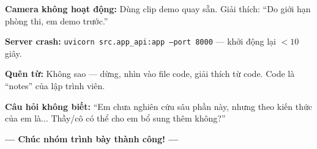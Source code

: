 \documentclass[12pt, a4paper]{article}
\begin{document}
\begin{tcolorbox}[colback=red!5, colframe=red!60, title=\textbf{Tình huống khẩn cấp}]
\textbf{Camera không hoạt động:}
Dùng clip demo quay sẵn. Giải thích: ``Do giới hạn phòng thi, em demo trước.''

\textbf{Server crash:}
\texttt{uvicorn src.app\_api:app --port 8000} --- khởi động lại $< 10$ giây.

\textbf{Quên từ:}
Không sao --- dừng, nhìn vào file code, giải thích từ code.
Code là ``notes'' của lập trình viên.

\textbf{Câu hỏi không biết:}
``Em chưa nghiên cứu sâu phần này,
nhưng theo kiến thức của em là... Thầy/cô có thể cho em bổ sung thêm không?''
\end{tcolorbox}

\vspace{1cm}
\begin{center}
\large\textbf{\textcolor{NavyBlue}{--- Chúc nhóm trình bày thành công! ---}}
\end{center}
\end{document}
